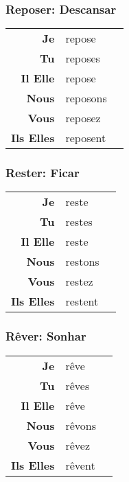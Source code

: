 \documentclass{subfiles}
\begin{document}
\begin{multicols*}{3}
        \subsubsection{Reposer: Descansar}
            \begin{tabular}{r l r}
                \textbf{Je}        & repose   &\\
                \textbf{Tu}        & reposes  &\\
                \textbf{Il Elle}   & repose   &\\
                \textbf{Nous}      & reposons &\\
                \textbf{Vous}      & reposez  &\\
                \textbf{Ils Elles} & reposent &\\
            \end{tabular}

        \subsubsection{Rester: Ficar}
            \begin{tabular}{r l r}
                \textbf{Je}        & reste   &\\
                \textbf{Tu}        & restes  &\\
                \textbf{Il Elle}   & reste   &\\
                \textbf{Nous}      & restons &\\
                \textbf{Vous}      & restez  &\\
                \textbf{Ils Elles} & restent &
            \end{tabular}

        \subsubsection{Rêver: Sonhar}
            \begin{tabular}{r l r}
                \textbf{Je}        & rêve   &\\
                \textbf{Tu}        & rêves  &\\
                \textbf{Il Elle}   & rêve   &\\
                \textbf{Nous}      & rêvons &\\
                \textbf{Vous}      & rêvez  &\\
                \textbf{Ils Elles} & rêvent &
            \end{tabular}


\end{multicols*}
\end{document}
